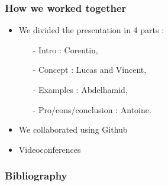 \documentclass{beamer}
\begin{document}
\begin{frame}
    \frametitle{How we worked together}
    \pause
    \begin{itemize}
        \setlength\itemsep{1em}
        \item We divided the presentation in 4 parts : \pause
            \begin{itemize}
                \item[-] Intro : Corentin,
                \item[-] Concept : Lucas and Vincent,
                \item[-] Examples : Abdelhamid,
                \item[-] Pro/cons/conclusion : Antoine.
            \end{itemize}
        \item We collaborated using Github \pause
        \item Videoconferences
    \end{itemize}

\end{frame}

\nocite{*}
\begin{frame}
    \frametitle{Bibliography}

    
    {\footnotesize
    }

\end{frame}
\end{document}
